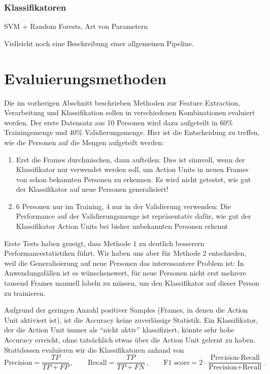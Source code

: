 \subsubsection{Klassifikatoren}
SVM + Random Forests, Art von Parametern

Vielleicht noch eine Beschreibung einer allgemeinen Pipeline.
\section{Evaluierungsmethoden}
Die im vorherigen Abschnitt beschrieben Methoden zur Feature Extraction,
Verarbeitung und Klassifikation sollen in verschiedenen Kombinationen evaluiert
werden. Der erste Datensatz aus 10 Personen wird dazu aufgeteilt in 60\%
Trainingsmenge und 40\% Validierungsmenge. Hier ist die Entscheidung zu treffen,
wie die Personen auf die Mengen aufgeteilt werden:
\begin{enumerate}
\item Erst die Frames durchmischen, dann aufteilen: Dies ist sinnvoll, wenn der
  Klassifikator nur verwendet werden soll, um Action Units in neuen Frames von schon bekannten
  Personen zu erkennen. Es wird nicht getestet, wie gut der Klassifikator auf
  neue Personen generalisiert!
  \item 6 Personen nur im Training, 4 nur in der Validierung verwenden: Die
    Performance auf der Validierungsmenge ist repräsentativ dafür, wie gut der
    Klassifikator Action Units bei bisher unbekannten Personen erkennt
\end{enumerate}
Erste Tests haben gezeigt, dass Methode 1 zu deutlich besserern
Performancestatistiken führt. Wir haben uns aber für Methode 2 entschieden, weil
die Generalisierung auf neue Personen das interessantere Problem ist: In
Anwendungsfällen ist es wünschenswert, für neue Personen nicht erst mehrere
tausend Frames manuell labeln zu müssen, um den Klassifikator auf dieser Person
zu trainieren.

Aufgrund der geringen Anzahl positiver Samples (Frames, in denen die Action Unit
aktiviert ist), ist die Accuracy keine zuverlässige Statistik. Ein Klassifikator,
der die Action Unit immer als ``nicht aktiv'' klassifiziert, könnte sehr hohe
Accuracy erreicht, ohne tatsächlich etwas über die Action Unit gelernt zu haben.
Stattdessen evaluieren wir die Klassifikatoren anhand von 
\begin{equation*}
\text{Precision}=\frac{TP}{TP+FP}\,, \qquad \text{Recall}=\frac{TP}{TP+FN}\,, \qquad \text{F1 score}=2\cdot\frac{\text{Precision}\cdot\text{Recall}}{\text{Precision}+\text{Recall}}\,.
\end{equation*}

